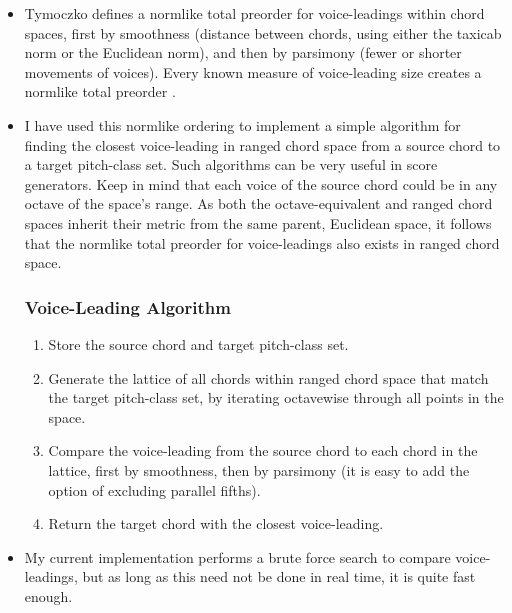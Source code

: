 \documentclass[14pt,letterpaper,onecolumn]{scrartcl}
\begin{document}
\begin{itemize}

\item Tymoczko defines a normlike total preorder for voice-leadings within chord spaces, first by smoothness (distance between chords, using either the taxicab norm or the Euclidean norm), and then by parsimony (fewer or shorter movements of voices). Every known measure of voice-leading size creates a normlike total preorder \cite{geometryofchords}.

\item I have used this normlike ordering to implement a simple algorithm for finding the closest voice-leading in ranged chord space from a source chord to a target pitch-class set. Such algorithms can be very useful in score generators. Keep in mind that each voice of the source chord could be in any octave of the space's range. As both the octave-equivalent and ranged chord spaces inherit their metric from the same parent, Euclidean space, it follows that the normlike total preorder for voice-leadings also exists in ranged chord space.

\subsubsection{Voice-Leading Algorithm}

\begin{enumerate}

\item Store the source chord and target pitch-class set.

\item Generate the lattice of all chords within ranged chord space that match the target pitch-class set, by iterating octavewise through all points in the space.

\item Compare the voice-leading from the source chord to each chord in the lattice, first by smoothness, then by parsimony (it is easy to add the option of excluding parallel fifths). 

\item Return the target chord with the closest voice-leading.

\end{enumerate}

\item My current implementation performs a brute force search to compare voice-leadings, but as long as this need not be done in real time, it is quite fast enough. 

\end{itemize}
\end{document}
